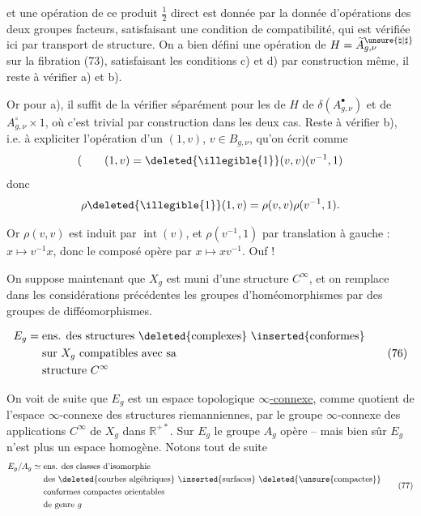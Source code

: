 et une opération de ce produit \(\frac12\) direct est donnée  par  la donnée d'opérations des deux groupes facteurs, satisfaisant une condition de compatibilité, qui est vérifiée ici par transport de structure. On a bien défini une opération de \(H=\widetilde A_{g,\nu}^{\unsure{\natural|\sharp}}\) sur la fibration (73),  satisfaisant les conditions c) et d) par construction même, il reste à vérifier a) et b).

Or pour a), il suffit de la vérifier séparément pour les  de \(H\) de \(\delta(A_{g,\nu}^{\bullet})\) et de \(A_{g,\nu}^{\circ}\times 1\), où c'est trivial par construction dans les deux cas. Reste à vérifier b), i.e. à expliciter l'opération d'un  \((1,v)\), \(v\in B_{g,\nu}\), qu'on écrit comme
\[
 (\qquad (1,v)=\deleted{\illegible{1}}(v,v)(v^{-1},1)
\]
donc
\[
 \rho\deleted{\illegible{1}}(1,v)=\rho(v,v)\rho(v^{-1},1).
\]

Or \(\rho(v,v)\) est induit par \(\operatorname{int}(v)\),  et \(\rho(v^{-1},1)\) par translation à gauche : \(x\mapsto v^{-1}x\), donc le composé opère par \(x\mapsto xv^{-1}\). Ouf !

On suppose maintenant que \(X_g\) est muni d'une structure \(C^\infty\), et on remplace dans les considérations  précédentes les groupes d'homéomorphismes par des groupes de difféomorphismes.

\[
 \begin{aligned}
 E_g={}&\text{ens. des structures \deleted{complexes} \inserted{conformes}}\\
 &\text{sur }X_g\text{ compatibles avec sa}\\
 &\text{structure }C^\infty
 \end{aligned}
 \tag{76}
\]

 On voit de suite que \(E_g\) est un espace topologique \uline{\(\infty\)-connexe}, comme quotient de l'espace \(\infty\)-connexe  des structures riemanniennes, par le  groupe \(\infty\)-connexe des applications \(C^\infty\) de \(X_g\) dans \(\mathbb R^{+*}\). Sur \(E_g\) le groupe \(A_g\) opère -- mais bien sûr \(E_g\) n'est plus un espace homogène. Notons tout de suite
\[
 \begin{aligned}
 E_g/A_g\simeq{}&\text{ens. des classes d'isomorphie}\\
 &\text{des \deleted{courbes algébriques} \inserted{surfaces} \deleted{\unsure{compactes}}}\\
 &\text{conformes compactes orientables}\\
 &\text{de genre }g
 \end{aligned}
 \tag{77}
\]

